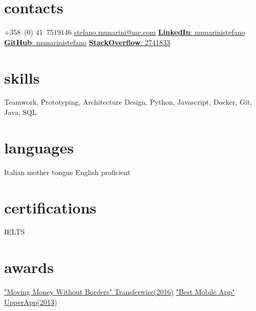 \documentclass[]{friggeri-cv}
\begin{document}


\begin{aside}
\section{contacts}
+358 (0) 41 7519146
\href{mailto:stefano.munarini@me.com}{stefano.munarini@me.com}
\href{https://it.linkedin.com/in/munarinistefano}{\textbf{LinkedIn}:
munarinistefano}
\href{https://github.com/stefanomunarini}{\textbf{GitHub}:
munarinistefano}
\href{http://stackexchange.com/users/2741833/stefano-munarini}{\textbf{StackOverflow}:
2741833}
\section{skills}
Teamwork, Prototyping,
Architecture Design,
Python, Javascript,
Docker, Git,
Java, SQL 
\section{languages}
Italian mother tongue
English proficient
\section{certifications}
IELTS
\section{awards}
\href{https://devpost.com/software/donatewise}{"Moving Money Without Borders" Transferwise(2016)}
\href{http://www.wired.it/mobile/app/2013/12/17/upperapp-migliori-app-studenti/}{"Best Mobile App" UpperApp(2013)}
\end{aside}

\end{document}
